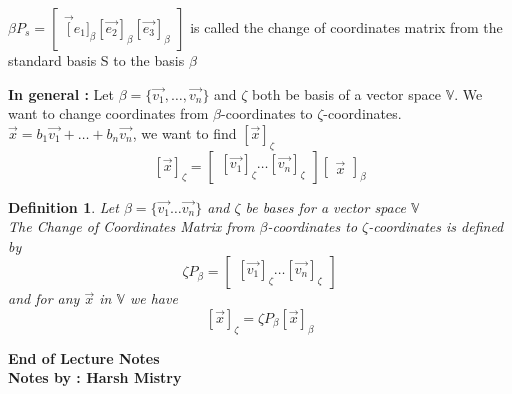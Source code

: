 \documentclass{article}
\newtheorem{definition}[theorem]{Definition}
\begin{document}
\(\beta P_s = \begin{bmatrix}\vec[{e_1}]_\beta [\vec{e_2}]_\beta [\vec{e_3}]_\beta \end{bmatrix} \) is called the change of coordinates matrix from the standard basis S to the basis \(\beta\) 


\newpage

\textbf{In general : }
Let \(\beta = \{\vec{v_1}, \ldots, \vec{v_n}\}\) and \(\zeta\) both be basis of a vector space \(\mathbb{V}\). We want to change coordinates from \(\beta\)-coordinates to \(\zeta\)-coordinates.\\
\(\vec{x} = b_1\vec{v_1} + \ldots + b_n\vec{v_n}\), we want to find \([\vec{x}]_\zeta\)
$$ [\vec{x}]_\zeta = \begin{bmatrix} [\vec{v_1}]_\zeta \ldots [\vec{v_n}]_\zeta \end{bmatrix} \begin{bmatrix} \vec{x}\end{bmatrix}_\beta $$

\begin{definition}
Let \(\beta = \{ \vec{v_1} \ldots \vec{v_n} \} \)  and \(\zeta\) be bases for a vector space \(\mathbb{V}\)\\
The Change of Coordinates Matrix from \(\beta\)-coordinates to \(\zeta\)-coordinates is defined by 
$$ \zeta P_\beta = \begin{bmatrix} [\vec{v_1}]_\zeta \ldots [\vec{v_n}]_\zeta \end{bmatrix}  $$
and for any \(\vec{x}\) in \(\mathbb{V}\) we have 
$$ [\vec{x}]_\zeta = \zeta P_\beta [\vec{x}]_\beta $$
\end{definition}


\begin{center}
\textbf{End of Lecture Notes}\\
\textbf{Notes by : Harsh Mistry}
\end{center}
\end{document}
